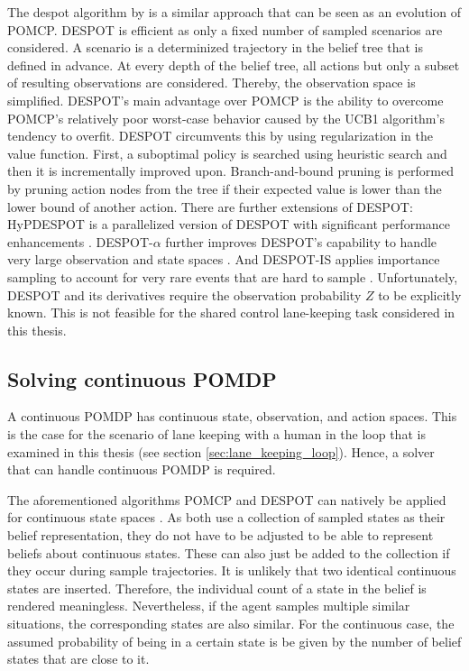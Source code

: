 The \gls{despot} algorithm by \cite{despot} is a similar approach that can be seen as an evolution of POMCP. DESPOT is efficient as only a fixed number of sampled scenarios are considered. A scenario is a determinized trajectory in the belief tree that is defined in advance. At every depth of the belief tree, all actions but only a subset of resulting observations are considered. Thereby, the observation space is simplified. DESPOT's main advantage over POMCP is the ability to overcome POMCP's relatively poor worst-case behavior \parencite{pomcp-worst-case} caused by the UCB1 algorithm's tendency to overfit. DESPOT circumvents this by using regularization in the value function. First, a suboptimal policy is searched using heuristic search \parencite{solver_hsvi} and then it is incrementally improved upon. Branch-and-bound pruning is performed by pruning action nodes from the tree if their expected value is lower than the lower bound of another action. There are further extensions of DESPOT: HyPDESPOT is a parallelized version of DESPOT with significant performance enhancements \parencite{hyp-despot}. DESPOT-$\alpha$ further improves DESPOT's capability to handle very large observation and state spaces \parencite{despot-a}. And DESPOT-IS applies importance sampling to account for very rare events that are hard to sample \parencite{despot-is}. Unfortunately, DESPOT and its derivatives require the observation probability $Z$ to be explicitly known. This is not feasible for the shared control lane-keeping task considered in this thesis.

\subsection{Solving continuous POMDP}


A continuous POMDP has continuous state, observation, and action spaces. This is the case for the scenario of lane keeping with a human in the loop that is examined in this thesis (see section \ref{sec:lane_keeping_loop}). Hence, a solver that can handle continuous POMDP is required.

The aforementioned algorithms POMCP and DESPOT can natively be applied for continuous state spaces \parencite{pomcp_continuous}. As both use a collection of sampled states as their belief representation, they do not have to be adjusted to be able to represent beliefs about continuous states. These can also just be added to the collection if they occur during sample trajectories. It is unlikely that two identical continuous states are inserted. Therefore, the individual count of a state in the belief is rendered meaningless. Nevertheless, if the agent samples multiple similar situations, the corresponding states are also similar. For the continuous case, the assumed probability of being in a certain state is be given by the number of belief states that are close to it.

